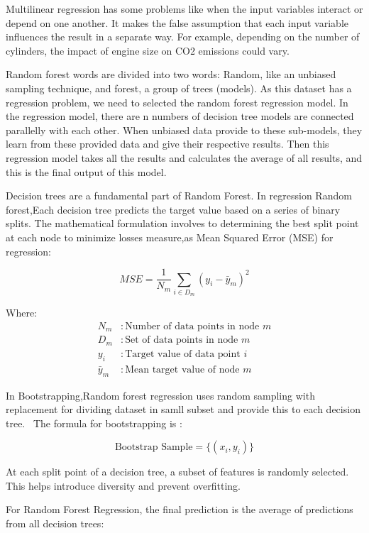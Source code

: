 \documentclass[12pt, a4paper,oneside]{book}
\numberwithin{equation}{section}
\begin{document}
Multilinear regression has some problems like when the input variables interact or depend on one another. It makes the false assumption that each input variable influences the result in a separate way.  For example, depending on the number of cylinders, the impact of engine size on CO2 emissions could vary. 

Random forest words are divided into two words: Random, like an unbiased sampling technique, and forest, a group of trees (models). As this dataset has a regression problem, we need to selected the random forest regression model. In the regression model, there are n numbers of decision tree models are connected parallelly with each other. When unbiased data provide to these sub-models, they learn from these provided data and give their respective results. Then this regression model takes all the results and calculates the average of all results, and this is the final output of this model.~\cite{ref12}

Decision trees are a fundamental part of Random Forest.
In regression Random forest,Each decision tree predicts the target value based on a series of binary splits. The mathematical formulation involves to determining the best split point at each node to minimize losses measure,as Mean Squared Error (MSE) for regression:

\[
MSE = \frac{1}{N_m} \sum_{i \in D_m} (y_i - \bar{y}_m)^2
\]

Where:
\begin{align*}
N_m &: \text{Number of data points in node } m \\
D_m &: \text{Set of data points in node } m \\
y_i &: \text{Target value of data point } i \\
\bar{y}_m &: \text{Mean target value of node } m
\end{align*}


In Bootstrapping,Random forest regression uses random sampling with replacement for dividing dataset in samll subset and provide this to each decision tree.~\cite{ref12}
The formula for bootstrapping is :

\[
\text{Bootstrap Sample} = \{ (x_i, y_i) \}
\]


At each split point of a decision tree, a subset of features is randomly selected. This helps introduce diversity and prevent overfitting.

For Random Forest Regression, the final prediction is the average of predictions from all decision trees:
\end{document}
